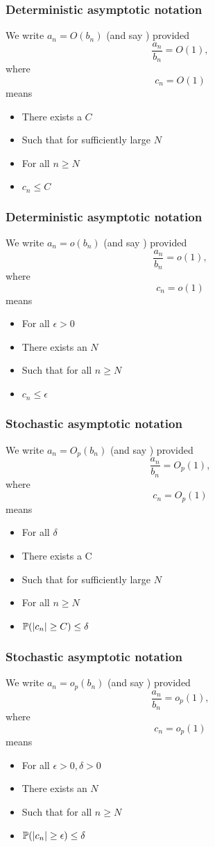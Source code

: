 \documentclass[12pt]{beamer}
\begin{document}
\begin{frame}
  \frametitle{Deterministic asymptotic notation}
We write $a_n = O(b_n)$ (and say ) provided
\[
\frac{a_n}{b_n} = O(1),
\]
where 
\[
c_n = O(1) 
\]
means 
\begin{itemize}
\item There exists a $C$
\item Such that for sufficiently large $N$
\item For all $n \geq N$
\item $c_n \leq C$
\end{itemize}
\end{frame}

\begin{frame}
  \frametitle{Deterministic asymptotic notation}
We write $a_n = o(b_n)$ (and say ) provided
\[
\frac{a_n}{b_n} = o(1),
\]
where 
\[
c_n = o(1) 
\]
means 
\begin{itemize}
\item For all $\epsilon>0$
\item There exists an $N$
\item Such that for all $n \geq N$
\item $c_n \leq \epsilon$
\end{itemize}
\end{frame}

\begin{frame}
  \frametitle{Stochastic asymptotic notation}
We write $a_n = O_p(b_n)$ (and say ) provided
\[
\frac{a_n}{b_n} = O_p(1),
\]
where 
\[
c_n = O_p(1) 
\]
means 
\begin{itemize}
\item For all $\delta$
\item There exists a C
\item Such that for sufficiently large $N$
\item For all $n \geq N$
\item $\P(|c_n|  \geq C)\leq \delta$
\end{itemize}
\end{frame}

\begin{frame}
  \frametitle{Stochastic asymptotic notation}
We write $a_n = o_p(b_n)$ (and say ) provided
\[
\frac{a_n}{b_n} = o_p(1),
\]
where 
\[
c_n = o_p(1) 
\]
means 
\begin{itemize}
\item For all $\epsilon>0,\delta > 0$
\item There exists an $N$
\item Such that for all $n \geq N$
\item $\P(|c_n| \geq \epsilon) \leq \delta$
\end{itemize}
\end{frame}
\end{document}
